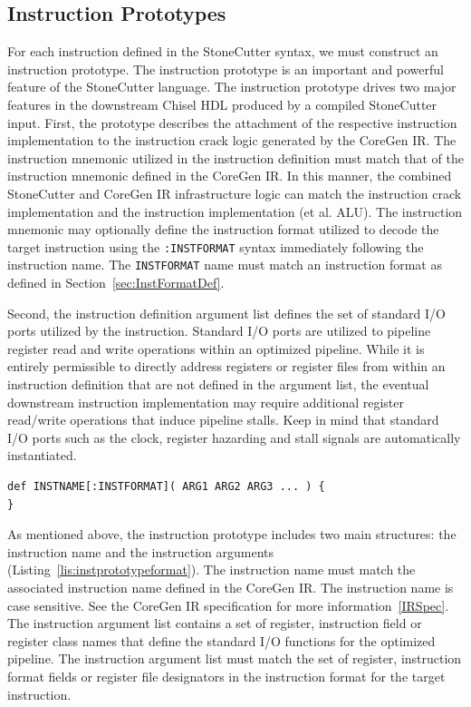 \documentclass{article}
\begin{document}
\clearpage
\subsection{Instruction Prototypes}
\label{sec:InstructionPrototypes}

For each instruction defined in the StoneCutter syntax, we must construct 
an instruction prototype.  The instruction prototype is an important and powerful 
feature of the StoneCutter language.  The instruction prototype drives two major 
features in the downstream Chisel HDL produced by a compiled StoneCutter input.  
First, the prototype describes the attachment of the respective instruction implementation 
to the instruction crack logic generated by the CoreGen IR.  The instruction mnemonic 
utilized in the instruction definition must match that of the instruction mnemonic defined 
in the CoreGen IR.  In this manner, the combined StoneCutter and CoreGen IR infrastructure 
logic can match the instruction crack implementation and the instruction implementation (et al. ALU).  
The instruction mnemonic may optionally define the instruction format utilized to decode the 
target instruction using the \texttt{:INSTFORMAT} syntax immediately following the instruction name.  
The \texttt{INSTFORMAT} name must match an instruction format as defined in Section~\ref{sec:InstFormatDef}.    

Second, the instruction definition argument list defines the set of standard I/O ports utilized by the 
instruction.  Standard I/O ports are utilized to pipeline register read and write operations within an 
optimized pipeline.  While it is entirely permissible to directly address registers or register files 
from within an instruction definition that are not defined in the argument list, the eventual downstream 
instruction implementation may require additional register read/write operations that induce pipeline 
stalls.  Keep in mind that standard I/O ports such as the clock, register hazarding and stall signals 
are automatically instantiated.  

\vspace{0.125in}
\begin{lstlisting}[frame=single,style=base,caption={Instruction Prototype Format},captionpos=b,label={lis:instprototypeformat}]
def INSTNAME[:INSTFORMAT]( ARG1 ARG2 ARG3 ... ) {
}
\end{lstlisting}

As mentioned above, the instruction prototype includes two main structures: the instruction 
name and the instruction arguments (Listing~\ref{lis:instprototypeformat}).  The instruction name must match the associated instruction 
name defined in the CoreGen IR.  The instruction name is case sensitive.  
See the CoreGen IR specification for more information~\ref{IRSpec}.  The instruction 
argument list contains a set of register, instruction field or register class names that define the standard I/O functions 
for the optimized pipeline.  The instruction argument list must match the set of register, instruction format fields or register file designators 
in the instruction format for the target instruction. 
  
\end{document}
